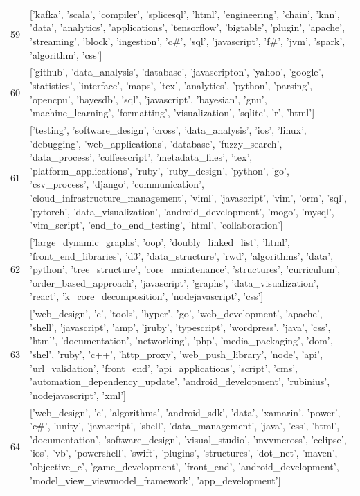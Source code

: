 \begin{center}
\begin{longtable}{|p{1.5cm}|p{12.5cm}|}
            59 & ['kafka', 'scala', 'compiler', 'splicesql', 'html', 'engineering', 'chain', 'knn', 'data', 'analytics', 'applications', 'tensorflow', 'bigtable', 'plugin', 'apache', 'streaming', 'block', 'ingestion', 'c\#', 'sql', 'javascript', 'f\#', 'jvm', 'spark', 'algorithm', 'css']  \\ 
            60 & ['github', 'data\_analysis', 'database', 'javascripton', 'yahoo', 'google', 'statistics', 'interface', 'maps', 'tex', 'analytics', 'python', 'parsing', 'opencpu', 'bayesdb', 'sql', 'javascript', 'bayesian', 'gnu', 'machine\_learning', 'formatting', 'visualization', 'sqlite', 'r', 'html']  \\ 
            61 & ['testing', 'software\_design', 'cross', 'data\_analysis', 'ios', 'linux', 'debugging', 'web\_applications', 'database', 'fuzzy\_search', 'data\_process', 'coffeescript', 'metadata\_files', 'tex', 'platform\_applications', 'ruby', 'ruby\_design', 'python', 'go', 'csv\_process', 'django', 'communication', 'cloud\_infrastructure\_management', 'viml', 'javascript', 'vim', 'orm', 'sql', 'pytorch', 'data\_visualization', 'android\_development', 'mogo', 'mysql', 'vim\_script', 'end\_to\_end\_testing', 'html', 'collaboration']  \\ 
            62 & ['large\_dynamic\_graphs', 'oop', 'doubly\_linked\_list', 'html', 'front\_end\_libraries', 'd3', 'data\_structure', 'rwd', 'algorithms', 'data', 'python', 'tree\_structure', 'core\_maintenance', 'structures', 'curriculum', 'order\_based\_approach', 'javascript', 'graphs', 'data\_visualization', 'react', 'k\_core\_decomposition', 'nodejavascript', 'css']  \\ 
            63 & ['web\_design', 'c', 'tools', 'hyper', 'go', 'web\_development', 'apache', 'shell', 'javascript', 'amp', 'jruby', 'typescript', 'wordpress', 'java', 'css', 'html', 'documentation', 'networking', 'php', 'media\_packaging', 'dom', 'shel', 'ruby', 'c++', 'http\_proxy', 'web\_push\_library', 'node', 'api', 'url\_validation', 'front\_end', 'api\_applications', 'script', 'cms', 'automation\_dependency\_update', 'android\_development', 'rubinius', 'nodejavascript', 'xml']  \\ 
            64 & ['web\_design', 'c', 'algorithms', 'android\_sdk', 'data', 'xamarin', 'power', 'c\#', 'unity', 'javascript', 'shell', 'data\_management', 'java', 'css', 'html', 'documentation', 'software\_design', 'visual\_studio', 'mvvmcross', 'eclipse', 'ios', 'vb', 'powershell', 'swift', 'plugins', 'structures', 'dot\_net', 'maven', 'objective\_c', 'game\_development', 'front\_end', 'android\_development', 'model\_view\_viewmodel\_framework', 'app\_development']  \\ 

\end{longtable}
\end{center}
